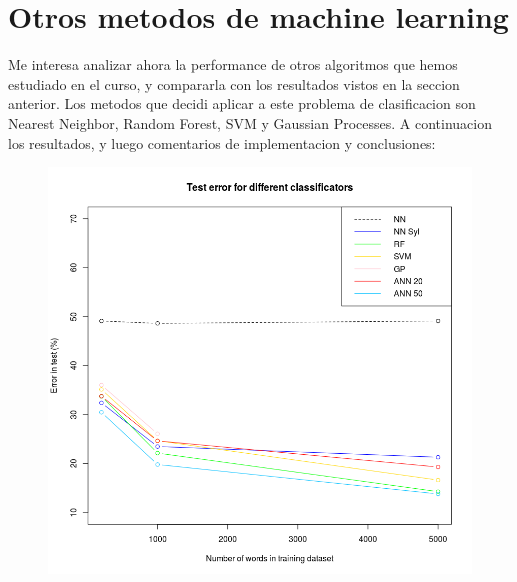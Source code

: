 \documentclass[paper=a4, fontsize=11pt]{scrartcl} %
\numberwithin{equation}{section} %
\numberwithin{figure}{section} %
\numberwithin{table}{section} %
\begin{document}
\section{ Otros metodos de machine learning }

Me interesa analizar ahora la performance de otros algoritmos que hemos estudiado en el curso, y compararla con los resultados vistos en la seccion anterior. Los metodos que decidi aplicar a este problema de clasificacion son Nearest Neighbor, Random Forest, SVM y Gaussian Processes. A continuacion los resultados, y luego comentarios de implementacion y conclusiones:

\begin{center}
\begin{figure}[h!]
\includegraphics[width=170mm]{figure.png}
\end{figure}
\end{center}
\end{document}
